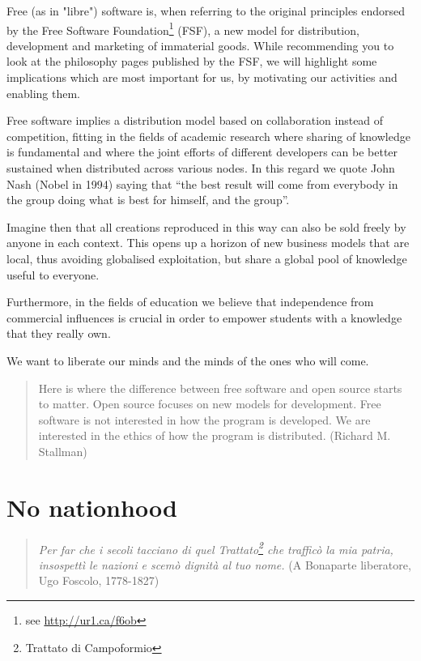 Free (as in "libre") software is, when referring to the original principles
endorsed by the Free Software Foundation\footnote{see \url{http://ur1.ca/f6ob}}
(FSF), a new model for distribution, development and marketing of immaterial
goods. While recommending you to look at the philosophy pages published by the
FSF, we will highlight some implications which are most important for us, by
motivating our activities and enabling them.

Free software implies a distribution model based on collaboration instead of
competition, f\hbox{}itting in the f\hbox{}ields of academic research where
sharing of knowledge is fundamental and where the joint ef\hbox{}forts of
dif\hbox{}ferent developers can be better sustained when distributed across
various nodes. In this regard we quote John Nash (Nobel in 1994) saying that
``the best result will come from everybody in the group doing what is best for
himself, and the group''.

Imagine then that all creations reproduced in this way can also be sold freely
by anyone in each context. This opens up a horizon of new business models that
are local, thus avoiding globalised exploitation, but share a global pool of
knowledge useful to everyone.

Furthermore, in the f\hbox{}ields of education we believe that independence from
commercial inf\hbox{}luences is crucial in order to empower students with a
knowledge that they really own.

We want to liberate our minds and the minds of the ones who will come.

\begin{quote}
Here is where the dif\hbox{}ference between free software and open source starts
to matter. Open source focuses on new models for development. Free software is
not interested in how the program is developed. We are interested in the ethics
of how the program is distributed. (Richard M. Stallman)
\end{quote}


\section{No nationhood}
\label{s:weaver_birds:nationhood}

\begin{quote}
\textit{Per far che i secoli tacciano di quel Trattato\footnote{Trattato di
Campoformio} che traf\hbox{}f\hbox{}icò la mia patria, insospettì le nazioni e
scemò dignità al tuo nome.} (A Bonaparte liberatore, Ugo Foscolo, 1778-1827)
\end{quote}

